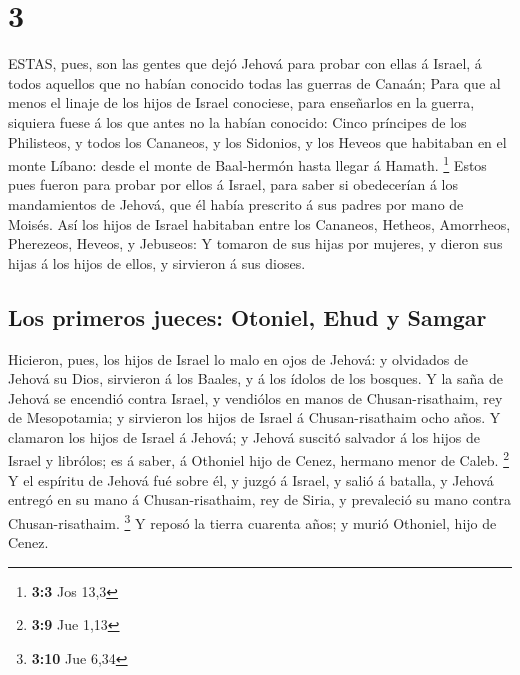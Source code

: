 \hypertarget{section-2}{%
\section{3}\label{section-2}}

 ESTAS, pues, son las gentes que dejó Jehová para probar con
ellas á Israel, á todos aquellos que no habían conocido todas las
guerras de Canaán;  Para que al menos el linaje de los hijos
de Israel conociese, para enseñarlos en la guerra, siquiera fuese á los
que antes no la habían conocido:  Cinco príncipes de los
Philisteos, y todos los Cananeos, y los Sidonios, y los Heveos que
habitaban en el monte Líbano: desde el monte de Baal-hermón hasta llegar
á Hamath. \footnote{\textbf{3:3} Jos 13,3}  Estos pues
fueron para probar por ellos á Israel, para saber si obedecerían á los
mandamientos de Jehová, que él había prescrito á sus padres por mano de
Moisés.  Así los hijos de Israel habitaban entre los
Cananeos, Hetheos, Amorrheos, Pherezeos, Heveos, y Jebuseos:
 Y tomaron de sus hijas por mujeres, y dieron sus hijas á
los hijos de ellos, y sirvieron á sus dioses.

\hypertarget{los-primeros-jueces-otoniel-ehud-y-samgar}{%
\subsection{Los primeros jueces: Otoniel, Ehud y
Samgar}\label{los-primeros-jueces-otoniel-ehud-y-samgar}}

 Hicieron, pues, los hijos de Israel lo malo en ojos de
Jehová: y olvidados de Jehová su Dios, sirvieron á los Baales, y á los
ídolos de los bosques.  Y la saña de Jehová se encendió
contra Israel, y vendiólos en manos de Chusan-risathaim, rey de
Mesopotamia; y sirvieron los hijos de Israel á Chusan-risathaim ocho
años.  Y clamaron los hijos de Israel á Jehová; y Jehová
suscitó salvador á los hijos de Israel y librólos; es á saber, á
Othoniel hijo de Cenez, hermano menor de Caleb. \footnote{\textbf{3:9}
  Jue 1,13}  Y el espíritu de Jehová fué sobre él, y juzgó
á Israel, y salió á batalla, y Jehová entregó en su mano á
Chusan-risathaim, rey de Siria, y prevaleció su mano contra
Chusan-risathaim. \footnote{\textbf{3:10} Jue 6,34}  Y
reposó la tierra cuarenta años; y murió Othoniel, hijo de Cenez.

